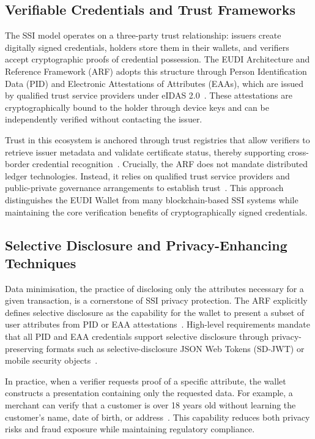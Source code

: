 \documentclass[sigconf,balance,nonacm,authordraft]{acmart}
\begin{document}
\subsection{Verifiable Credentials and Trust Frameworks}

The SSI model operates on a three-party trust relationship: issuers create digitally signed credentials, holders store them in their wallets, and verifiers accept cryptographic proofs of credential possession. The EUDI Architecture and Reference Framework (ARF) adopts this structure through Person Identification Data (PID) and Electronic Attestations of Attributes (EAAs), which are issued by qualified trust service providers under eIDAS 2.0~\cite{PortoThesis_Structure}. These attestations are cryptographically bound to the holder through device keys and can be independently verified without contacting the issuer.

Trust in this ecosystem is anchored through trust registries that allow verifiers to retrieve issuer metadata and validate certificate status, thereby supporting cross-border credential recognition~\cite{PortoThesis_Structure,Finextra_SSI_Components}. Crucially, the ARF does not mandate distributed ledger technologies. Instead, it relies on qualified trust service providers and public-private governance arrangements to establish trust~\cite{Finextra_SSI_Differences}. This approach distinguishes the EUDI Wallet from many blockchain-based SSI systems while maintaining the core verification benefits of cryptographically signed credentials.

\subsection{Selective Disclosure and Privacy-Enhancing Techniques}

Data minimisation, the practice of disclosing only the attributes necessary for a given transaction, is a cornerstone of SSI privacy protection. The ARF explicitly defines selective disclosure as the capability for the wallet to present a subset of user attributes from PID or EAA attestations~\cite{ARF_SelectDisclosureDefinition}. High-level requirements mandate that all PID and EAA credentials support selective disclosure through privacy-preserving formats such as selective-disclosure JSON Web Tokens (SD-JWT) or mobile security objects~\cite{ARF_AttestationSelectiveDisclosure}.

In practice, when a verifier requests proof of a specific attribute, the wallet constructs a presentation containing only the requested data. For example, a merchant can verify that a customer is over 18 years old without learning the customer's name, date of birth, or address~\cite{ISC2_SelectDisclosureExample,DocuSign_SelectDisclosure}. This capability reduces both privacy risks and fraud exposure while maintaining regulatory compliance.
\end{document}
